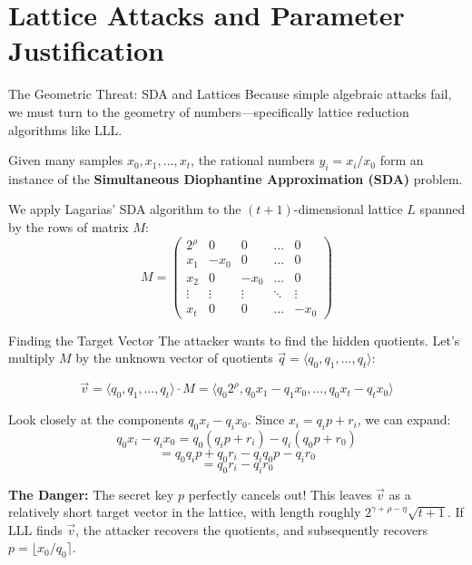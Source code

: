 \documentclass[10pt, aspectratio=169]{beamer}
\begin{document}
\section{Lattice Attacks and Parameter Justification}
\begin{frame}{The Geometric Threat: SDA and Lattices}
    Because simple algebraic attacks fail, we must turn to the geometry of numbers—specifically lattice reduction algorithms like LLL.
    \pause
    
    \vspace{0.2cm}
    Given many samples $x_0, x_1, \dots, x_t$, the rational numbers $y_i = x_i / x_0$ form an instance of the \textbf{Simultaneous Diophantine Approximation (SDA)} problem.
    \pause
    
    We apply Lagarias' SDA algorithm to the $(t+1)$-dimensional lattice $L$ spanned by the rows of matrix $M$:
    $$ M = \begin{pmatrix} 
    2^\rho & 0 & 0 & \dots & 0 \\ 
    x_1 & -x_0 & 0 & \dots & 0 \\ 
    x_2 & 0 & -x_0 & \dots & 0 \\ 
    \vdots & \vdots & \vdots & \ddots & \vdots \\ 
    x_t & 0 & 0 & \dots & -x_0 
    \end{pmatrix} $$
\end{frame}

\begin{frame}{Finding the Target Vector}
    The attacker wants to find the hidden quotients. Let's multiply $M$ by the unknown vector of quotients $\vec{q} = \langle q_0, q_1, \dots, q_t \rangle$:
    
    $$ \vec{v} = \langle q_0, q_1, \dots, q_t \rangle \cdot M = \langle q_0 2^\rho, q_0 x_1 - q_1 x_0, \dots, q_0 x_t - q_t x_0 \rangle $$
    \pause
    
    \vspace{0.3cm}
    Look closely at the components $q_0 x_i - q_i x_0$. Since $x_i = q_i p + r_i$, we can expand:
    $$ q_0 x_i - q_i x_0 = q_0(q_i p + r_i) - q_i(q_0 p + r_0) $$
    $$ = q_0 q_i p + q_0 r_i - q_i q_0 p - q_i r_0 $$
    $$ = q_0 r_i - q_i r_0 $$
    \pause
    
    \vspace{0.3cm}
    \textbf{The Danger:} The secret key $p$ perfectly cancels out! This leaves $\vec{v}$ as a relatively short target vector in the lattice, with length roughly $2^{\gamma+\rho-\eta}\sqrt{t+1}$. If LLL finds $\vec{v}$, the attacker recovers the quotients, and subsequently recovers $p = \lfloor x_0 / q_0 \rceil$.
\end{frame}
\end{document}
